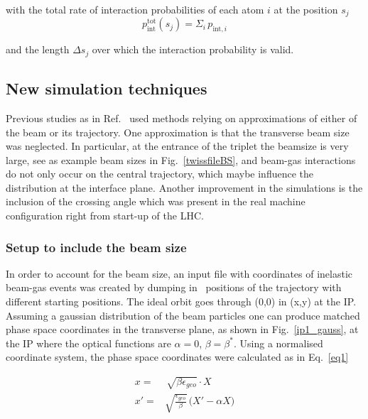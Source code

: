 with the total rate of interaction probabilities of each atom $i$ at the position $s_j$ 
\begin{equation*} 
  p_{\mathrm{int}}^{\mathrm{tot}} (s_j) = \Sigma_i \, p_{\textrm{int},i}
\end{equation*}

and the length $\Delta s_{j}$ over which the interaction probability is valid.

\subsection{New simulation techniques}
Previous studies as in Ref.~\cite{nimPaperRod} used methods relying on approximations of either of the beam or its trajectory. One approximation is that the transverse beam size was neglected. In particular, at the entrance of the triplet the beamsize is very large, see as example beam sizes in Fig.~\ref{twissfileBS}, and beam-gas interactions do not only occur on the central trajectory, which maybe influence the distribution at the interface plane. Another improvement in the simulations is the inclusion of the crossing angle which was present in the real machine configuration right from start-up of the LHC.

\subsubsection{Setup to include the beam size}

In order to account for the beam size, an input file with coordinates of inelastic beam-gas events was created by dumping in \fluka~positions of the trajectory with different starting positions. The ideal orbit goes through (0,0) in (x,y) at the IP. Assuming a gaussian distribution of the beam particles one can produce matched phase space coordinates in the transverse plane, as shown in Fig.~\ref{ip1_gauss}, at the IP where the optical functions are $\alpha=0$, $\beta=\beta^*$. Using a normalised coordinate system, the phase space coordinates were calculated as in Eq.~\ref{eq1}

\begin{equation} \label{eq1}
  \begin{split}
x = & \, \sqrt{\beta \epsilon_{geo}} \cdot X \\
x' = & \sqrt{\frac{\epsilon_{geo}}{\beta}} \, \big( X' - \alpha X \big)
  \end{split}
\end{equation}

